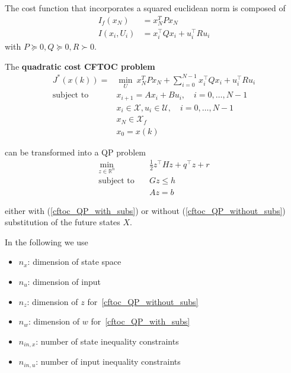 The cost function that incorporates a squared euclidean norm is composed of
\begin{align*}
    I_f(x_N)   & = x_N^T P x_N                     \\
    I(x_i,U_i) & = x_i^\top Q x_i + u_i^\top R u_i
\end{align*}
with $P\succeq0, Q\succeq0, R\succ0$.

\newpar{}

The \textbf{quadratic cost CFTOC problem}
\begin{align*}
    J^*(x(k)) =            & \min_U \: x_N^T P x_N + \sum_{i=0}^{N-1}x_i^\top Q x_i + u_i^\top R u_i \\
    \text{subject to}\quad & x_{i+1} = Ax_i +Bu_i, \quad i = 0, \ldots, N-1                          \\
                           & x_i \in \mathcal{X}, u_i \in \mathcal{U}, \quad i = 0, \ldots, N-1      \\
                           & x_N \in \mathcal{X}_f                                                   \\
                           & x_0 = x(k)
\end{align*}

can be transformed into a QP problem
\begin{align*}
    \min_{z\in\mathbb{R}^n} & \frac{1}{2}z^\top Hz + q^\top z + r \\
    \text{subject to}\quad  & Gz \leq h                           \\
                            & Az = b
\end{align*}

either with (\ref{cftoc_QP_with_subs}) or without (\ref{cftoc_QP_without_subs}) substitution of the future states $X$.

\newpar{}

In the following we use
\begin{itemize}
    \item $n_x$: dimension of state space
    \item $n_u$: dimension of input
    \item $n_z$: dimension of $z$ for~\ref{cftoc_QP_without_subs}
    \item $n_w$: dimension of $w$ for~\ref{cftoc_QP_with_subs}
    \item $n_{in,x}$: number of state inequality constraints
    \item $n_{in,u}$: number of input inequality constraints
\end{itemize}

